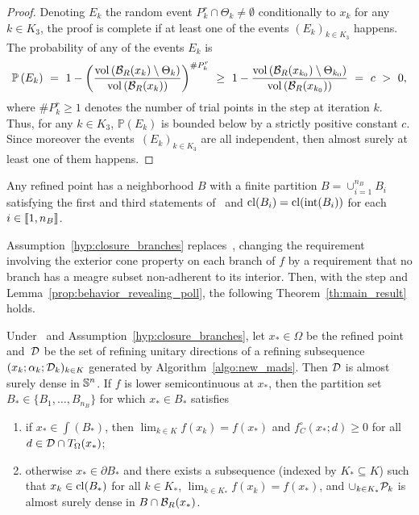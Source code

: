 \begin{proof}
	Denoting $E_k$ the random event $P_k^r \cap \Theta_k \neq \emptyset$ conditionally to $x_k$ for any $k \in K_3$, the proof is complete if at least one of the events $(E_k)_{k \in K_3}$ happens.
	The probability of any of the events $E_k$ is
    \begin{equation*}
		\mathbb{P}\left(E_k\right)
		\ = \
		1 - \left(
		\dfrac{\mathrm{vol}\left(\B_R(x_k)\setminus\Theta_k\right)}
		{\mathrm{vol}\left(\B_R(x_k)\right)}
		\right)^{\#P_k^r}
		\ \geq \
		1 -
		\dfrac{\mathrm{vol}\left(\B_R(x_{k_0})\setminus\Theta_{k_0}\right)}
		{\mathrm{vol}\left(\B_R(x_{k_0})\right)}
		\ = \ c \ > \ 0,
	\end{equation*}
    where $\#P_k^r \geq 1$ denotes the number of trial points in the \revpoll step at iteration $k$.
	Thus, for any $k \in K_3$, $\mathbb{P}(E_k)$ is bounded below by a strictly positive constant $c$.
	Since moreover the events~$(E_k)_{k \in K_3}$ are all independent, then almost surely at least one of them happens.
\end{proof}

\begin{assumption}
    \label{hyp:closure_branches}
    Any refined point has a neighborhood $B$ with a finite partition $B = \cup_{i=1}^{n_B} B_i$ satisfying the first and third statements of~\cite[Assumption~4.1]{ViCu2012} and $\cl(B_i) = \cl(\int(B_i))$ for each $i \in \ll1,n_B\rr$.
\end{assumption}

Assumption~\ref{hyp:closure_branches} replaces~\cite[Assumption~4.1]{ViCu2012}, changing the requirement involving the exterior cone property on each branch of $f$ by a requirement that no branch has a meagre subset non-adherent to its interior.
Then, with the \revpoll step and Lemma~\ref{prop:behavior_revealing_poll}, the following Theorem~\ref{th:main_result} holds.

\begin{theorem}
	\label{th:main_result}
	Under~\cite[Assumption~2.1]{ViCu2012} and Assumption~\ref{hyp:closure_branches}, let $x_* \in \Omega$ be the refined point and~$\D$ be the set of refining unitary directions of a refining subsequence $(x_k;\alpha_k;\D_k)_{k \in K}$ generated by Algorithm~\ref{algo:new_mads}.
	Then $\D$ is almost surely dense in $\S^n$.
	If $f$ is lower semicontinuous at $x_*$, then
	the partition set~$B_* \in \{B_1,\dots,B_{n_B}\}$ for which $x_* \in B_*$ satisfies
	\begin{enumerate}
		\item if $x_* \in \int(B_*)$, then $\lim_{k \in K}f(x_k) = f(x_*)$ and $f^\circ_C(x_*;d) \geq 0$ for all $d \in \D \cap T_\Omega(x_*)$;
		\item otherwise $x_* \in \partial B_*$ and there exists a subsequence (indexed by $K_* \subseteq K$) such that $x_k \in \cl(B_*)$ for all $k \in K_*$, $\lim_{k \in K_*} f(x_k) = f(x_*)$, and $\cup_{k \in K_*}\P_k$ is almost surely dense in $B \cap \B_R(x_*)$.
	\end{enumerate}
\end{theorem}

